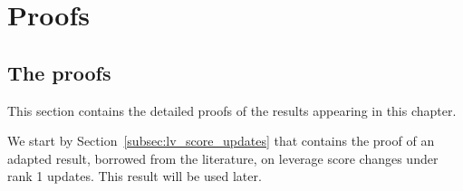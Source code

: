 \documentclass[twoside,11pt]{book}
\newtheorem{proposition}{Proposition}
\numberwithin{theorem}{chapter}
\numberwithin{definition}{chapter}
\numberwithin{proposition}{chapter}
\numberwithin{corollary}{chapter}
\numberwithin{example}{chapter}
\numberwithin{lemma}{chapter}
\numberwithin{assumption}{chapter}
\numberwithin{equation}{chapter}
\numberwithin{figure}{chapter}
\DeclareMathOperator{\Det}{Det}
\DeclareMathOperator{\DPP}{\mathrm{DPP}}
\DeclareMathOperator{\EX}{\mathbb{E}}
\begin{document}



\chapter*{Proofs}

\section{The proofs}
\label{s:proofs}
This section contains the detailed proofs of the results appearing in this chapter. 

We start by Section~\ref{subsec:lv_score_updates} that  contains the proof of an adapted result, borrowed from the literature, on leverage score changes under rank 1 updates. This result will be used later.
\end{document}
